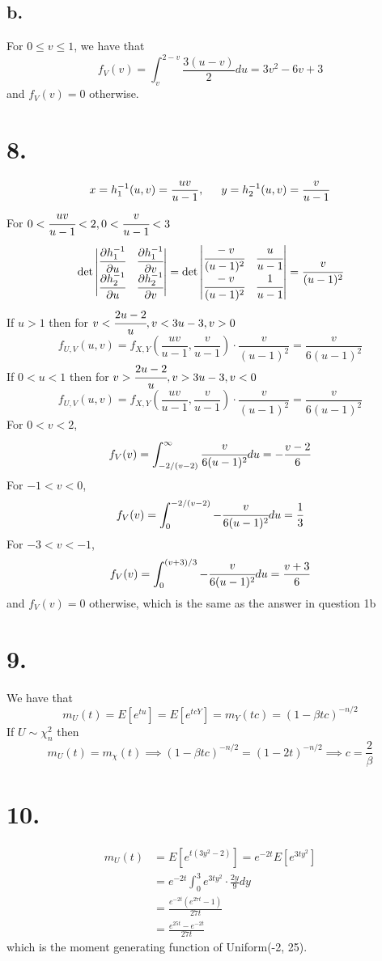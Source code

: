 \documentclass[11pt]{article}
\begin{document}
\subsection*{b.}
For $0\le v \le 1$, we have that 
\[
    f_V(v) = \int_v^{2-v} \frac{3(u-v)}{2} du = 3 v^{2} - 6 v + 3 
\]
and $f_V(v) = 0$ otherwise.
\pagebreak
\section*{8.}
\[
    x = h_1^{-1}(u,v) = \frac{uv}{u-1}, \indent y = h_2^{-1}(u,v) = \frac{v}{u-1}
\]
For $0<\cfrac{uv}{u-1}<2, 0<\cfrac{v}{u-1}<3$ 
\[
    \det 
    \begin{vmatrix}
        \cfrac{\partial h_1^{-1}}{\partial u} & \cfrac{\partial h_1^{-1}}{\partial v} \\
        \cfrac{\partial h_2^{-1}}{\partial u} & \cfrac{\partial h_2^{-1}}{\partial v}
    \end{vmatrix}    
    = 
    \det 
    \begin{vmatrix}
        \cfrac{-v}{(u-1)^2} & \cfrac{u}{u-1} \\
        \cfrac{-v}{(u-1)^2} & \cfrac{1}{u-1} 
    \end{vmatrix}
    = \cfrac{v}{(u-1)^2}
\]
If $u>1$ then for $v<\cfrac{2u-2}{u}, v < 3u-3, v>0$ 
\[
    f_{U,V}(u,v) = f_{X,Y}\left(\frac{uv}{u-1}, \frac{v}{u-1}\right) \cdot \frac{v}{(u-1)^2} = \frac{v}{6(u-1)^2}
\]
If $0<u<1$ then for $v>\cfrac{2u-2}{u}, v>3u-3, v<0$
\[
    f_{U,V}(u,v) = f_{X,Y}\left(\frac{uv}{u-1}, \frac{v}{u-1}\right) \cdot \frac{v}{(u-1)^2} = \frac{v}{6(u-1)^2}
\]
For $0<v<2$, 
\[
    f_V(v) = \int_{-2/(v-2)}^\infty \cfrac{v}{6(u-1)^2} du  = -\frac{v-2}{6}
\]
For $-1<v<0$,
\[
    f_V(v) = \int_{0}^{-2/(v-2)} -\cfrac{v}{6(u-1)^2} du = \frac{1}{3}
\]
For $-3<v<-1$,
\[
    f_V(v) = \int_{0}^{(v+3)/3} -\cfrac{v}{6(u-1)^2} du = \frac{v+3}{6}
\]
and $f_V(v) = 0$ otherwise,
which is the same as the answer in question 1b
\pagebreak
\section*{9.}
We have that
\[
    m_U(t) = E[e^{tu}] = E[e^{tcY}] = m_Y(tc) = (1-\beta tc)^{-n/2}
\]
If $U \sim \chi_n^2$ then
\[
    m_U(t) = m_\chi(t) \implies (1-\beta tc)^{-n/2} = (1-2t)^{-n/2} \implies c = \frac{2}{\beta}  
\]
\pagebreak
\section*{10.}
\begin{equation*}
    \begin{aligned}
        m_U(t) &= E[e^{t(3y^2-2)}] = e^{-2t}E[e^{3ty^2}] \\
        &= e^{-2t} \int_0^3 e^{3ty^2} \cdot \frac{2y}{9} dy \\
        &= \frac{e^{-2t} (e^{27t}-1)}{27t} \\
        &= \frac{e^{25t} - e^{-2t}}{27t}          
    \end{aligned}
\end{equation*}
which is the moment generating function of Uniform(-2, 25).
\pagebreak
\end{document}

